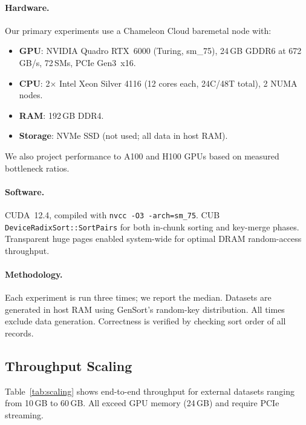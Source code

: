 \documentclass[conference,10pt]{IEEEtran}
\begin{document}
\paragraph{Hardware.}
Our primary experiments use a Chameleon Cloud baremetal node with:
\begin{itemize}[leftmargin=*,topsep=2pt,itemsep=1pt]
  \item \textbf{GPU}: NVIDIA Quadro RTX~6000 (Turing, sm\_75), 24\,GB GDDR6
    at 672\,GB/s, 72\,SMs, PCIe Gen3~x16.
  \item \textbf{CPU}: 2$\times$ Intel Xeon Silver 4116 (12 cores each,
    24C/48T total), 2 NUMA nodes.
  \item \textbf{RAM}: 192\,GB DDR4.
  \item \textbf{Storage}: NVMe SSD (not used; all data in host RAM).
\end{itemize}
We also project performance to A100 and H100 GPUs based on measured
bottleneck ratios.

\paragraph{Software.}
CUDA~12.4, compiled with \texttt{nvcc -O3 -arch=sm\_75}.
CUB \texttt{DeviceRadixSort::SortPairs} for both in-chunk sorting
and key-merge phases.  Transparent huge pages enabled system-wide
for optimal DRAM random-access throughput.

\paragraph{Methodology.}
Each experiment is run three times; we report the median.  Datasets
are generated in host RAM using GenSort's random-key distribution.
All times exclude data generation.  Correctness is verified by
checking sort order of all records.

\subsection{Throughput Scaling}

Table~\ref{tab:scaling} shows end-to-end throughput for external datasets
ranging from 10\,GB to 60\,GB.  All exceed GPU memory (24\,GB) and require
PCIe streaming.
\end{document}
